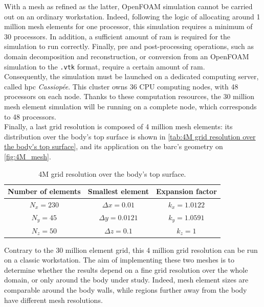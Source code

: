 \documentclass[12pt,twoside]{report}
\begin{document}
With a mesh as refined as the latter, OpenFOAM simulation cannot be carried out on an ordinary workstation. Indeed, following the logic of allocating around 1 million mesh elements for one processor, this simulation requires a minimum of 30 processors. In addition, a sufficient amount of \gls{ram} is required for the simulation to run correctly. Finally, pre and post-processing operations, such as domain decomposition and reconstruction, or conversion from an OpenFOAM simulation to the \texttt{.vtk} format, require a certain amount of \gls{ram}.\\

Consequently, the simulation must be launched on a dedicated computing server, called \gls{hpc} \textsl{Cassiopée}. This cluster owns 36 CPU computing nodes, with 48 processors on each node. Thanks to these computation resources, the 30 million mesh element simulation will be running on a complete node, which corresponds to 48 processors. \\

Finally, a last grid resolution is composed of 4 million mesh elements: its distribution over the body's top surface is shown in \autoref{tab:4M grid resolution over the body's top surface}, and its application on the \gls{barc}'s geometry on \autoref{fig:4M_mesh}.
\begin{table}[h!]
\centering
\begin{tabular}{ccc} \toprule[1.5pt]
\textbf{Number of elements} & \textbf{Smallest element} & \textbf{Expansion factor} \\ \midrule[0.25pt]
$N_x=230$ & $\Delta x=0.01$ & $k_x=1.0122$ \\
$N_y=45$ & $\Delta y=0.0121$ & $k_y=1.0591$ \\
$N_z=50$ & $\Delta z=0.1$ & $k_z=1$ \\ \bottomrule[1.5pt]
\end{tabular}
\caption{4M grid resolution over the body's top surface.}
\label{tab:4M grid resolution over the body's top surface}
\end{table}

\clearpage

Contrary to the 30 million element grid, this 4 million grid resolution can be run on a classic workstation. The aim of implementing these two meshes is to determine whether the results depend on a fine grid resolution over the whole domain, or only around the body under study. Indeed, mesh element sizes are comparable around the body walls, while regions further away from the body have different mesh resolutions.
\end{document}
